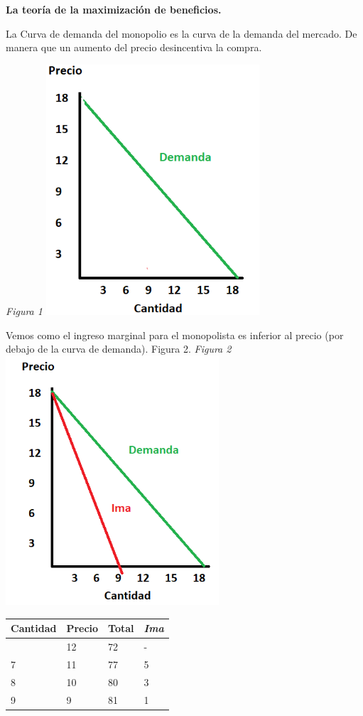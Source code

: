 \documentclass[
]{article}
\begin{document}
\textbf{La teoría de la maximización de beneficios.}

La Curva de demanda del monopolio es la curva de la demanda del mercado.
De manera que un aumento del precio desincentiva la compra.

\emph{Figura 1}
\includegraphics[width=3.125in,height=\textheight]{png/Figura1.png}

Vemos como el ingreso marginal para el monopolista es inferior al precio
(por debajo de la curva de demanda). Figura 2. \emph{Figura 2}
\includegraphics[width=3.125in,height=\textheight]{png/Figura2.png}

\begin{longtable}[]{@{}llll@{}}
\toprule\noalign{}
Cantidad & Precio & Total & \emph{Ima} \\
\midrule\noalign{}
\endhead
\bottomrule\noalign{}
\endlastfoot
6 & 12 & 72 & - \\
7 & 11 & 77 & 5 \\
8 & 10 & 80 & 3 \\
9 & 9 & 81 & 1 \\
\end{longtable}
\end{document}
